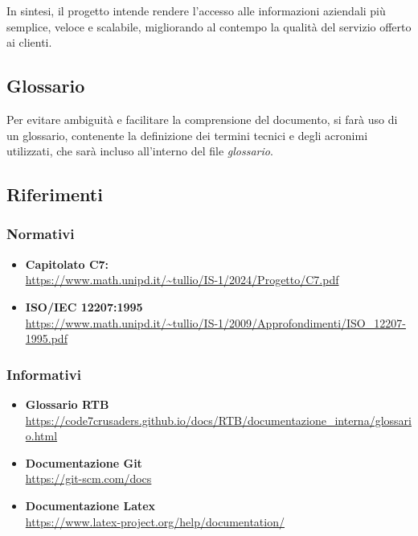 In sintesi, il progetto intende rendere l'accesso alle informazioni aziendali più semplice, veloce e scalabile, 
migliorando al contempo la qualità del servizio offerto ai clienti.


\subsection{Glossario}
Per evitare ambiguità e facilitare la comprensione del documento, si farà uso di un glossario, 
contenente la definizione dei termini tecnici e degli acronimi utilizzati, 
che sarà incluso all'interno del file \textit{glossario}.


\subsection{Riferimenti}
\subsubsection{Normativi}
\begin{itemize}
	\item \textbf{Capitolato C7:} \\ \url{https://www.math.unipd.it/~tullio/IS-1/2024/Progetto/C7.pdf}
	\item \textbf{ISO/IEC 12207:1995} \\ \url{https://www.math.unipd.it/~tullio/IS-1/2009/Approfondimenti/ISO_12207-1995.pdf}
\end{itemize}

\subsubsection{Informativi}
\begin{itemize}
    \item\textbf{Glossario RTB}\\ \url{https://code7crusaders.github.io/docs/RTB/documentazione_interna/glossario.html}
    \item\textbf{Documentazione Git}\\ \url{https://git-scm.com/docs}
    \item\textbf{Documentazione Latex}\\ \url{https://www.latex-project.org/help/documentation/}

\end{itemize}
